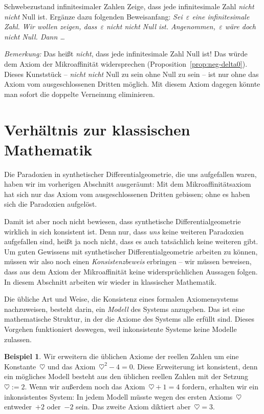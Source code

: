 \documentclass[twoside]{../zirkelblatt}
\theoremstyle{definition}
\newtheorem{bsp}[defn]{Beispiel}
\theoremstyle{plain}
\theoremstyle{remark}
\begin{document}
\begin{aufgabeShaded}{Schwebezustand infinitesimaler Zahlen}
\label{aufg:schwebezustand}
Zeige, dass jede infinitesimale Zahl \emph{nicht nicht} Null ist. Ergänze dazu
folgenden Be\-weis\-an\-fang:
\emph{Sei~$\varepsilon$ eine infinitesimale Zahl. Wir wollen zeigen,
dass~$\varepsilon$ \emph{nicht nicht} Null ist. Angenommen,~$\varepsilon$ wäre
doch nicht Null. Dann \ldots}

\emph{Bemerkung:} Das heißt \emph{nicht}, dass jede infinitesimale Zahl Null
ist! Das würde dem Axiom der Mikroaffinität widersprechen
(Proposition~\ref{prop:neg-delta0}). Dieses Kunststück -- \emph{nicht nicht}
Null zu sein ohne Null zu sein -- ist nur ohne das Axiom vom ausgeschlossenen
Dritten möglich. Mit diesem Axiom dagegen könnte man sofort die doppelte
Verneinung eliminieren.
\end{aufgabeShaded}


\section{Verhältnis zur klassischen Mathematik}

Die Paradoxien in synthetischer Differentialgeometrie, die uns aufgefallen
waren, haben wir im vorherigen Abschnitt ausgeräumt: Mit dem
Mikroaffinitätsaxiom hat sich nur das Axiom vom ausgeschlossenen Dritten
gebissen; ohne es haben sich die Paradoxien aufgelöst.

Damit ist aber noch nicht bewiesen, dass synthetische Differentialgeometrie
wirklich in sich konsistent ist. Denn nur, dass \emph{uns} keine weiteren
Paradoxien aufgefallen sind, heißt ja noch nicht, dass es auch tatsächlich
keine weiteren gibt. Um guten Gewissens mit synthetischer Differentialgeometrie
arbeiten zu können, müssen wir also noch einen \emph{Konsistenzbeweis}
erbringen -- wir müssen beweisen, dass aus dem Axiom der Mikroaffinität
keine widersprüchlichen Aussagen folgen. In diesem Abschnitt arbeiten wir
wieder in klassischer Mathematik.

Die übliche Art und Weise, die Konsistenz eines formalen Axiomensystems
nachzuweisen, besteht darin, ein \emph{Modell} des Systems anzugeben. Das ist
eine mathematische Struktur, in der die Axiome des Systems alle erfüllt sind.
Dieses Vorgehen funktioniert deswegen, weil inkonsistente Systeme keine Modelle
zulassen.

\begin{bsp}Wir erweitern die üblichen Axiome der reellen
Zahlen um eine Konstante~$\heartsuit$ und das Axiom~$\heartsuit^2 - 4 = 0$.
Diese Erweiterung ist konsistent, denn ein mögliches Modell besteht aus den
üblichen reellen Zahlen mit der Setzung~$\heartsuit := 2$. Wenn wir außerdem
noch das Axiom~$\heartsuit + 1 = 4$ fordern, erhalten wir ein inkonsistentes
System: In jedem Modell müsste wegen des ersten Axioms~$\heartsuit$
entweder~$+2$ oder~$-2$ sein. Das zweite Axiom diktiert aber~$\heartsuit =
3$.\end{bsp}
\end{document}
